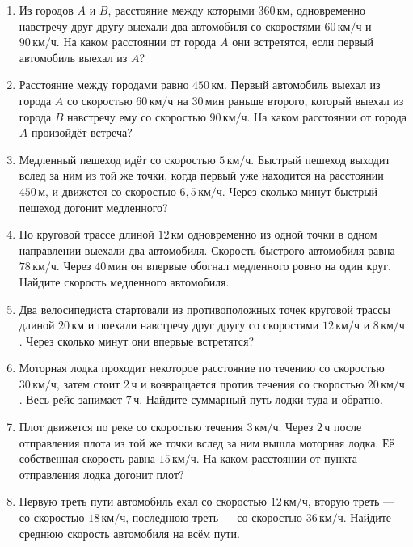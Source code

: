 \documentclass[a4paper,12pt]{article}
\newcommand{\unit}[1]{\,\text{#1}}
\begin{document}
\begin{enumerate}

\item
Из городов $A$ и $B$, расстояние между которыми $360\unit{км}$,
одновременно навстречу друг другу выехали два автомобиля
со скоростями $60\unit{км/ч}$ и $90\unit{км/ч}$.
На каком расстоянии от города $A$ они встретятся,
если первый автомобиль выехал из $A$?

\item
Расстояние между городами равно $450\unit{км}$.
Первый автомобиль выехал из города $A$ со скоростью $60\unit{км/ч}$
на $30\unit{мин}$ раньше второго,
который выехал из города $B$ навстречу ему со скоростью $90\unit{км/ч}$.
На каком расстоянии от города $A$ произойдёт встреча?

\item
Медленный пешеход идёт со скоростью $5\unit{км/ч}$.
Быстрый пешеход выходит вслед за ним из той же точки,
когда первый уже находится на расстоянии $450\unit{м}$,
и движется со скоростью $6{,}5\unit{км/ч}$.
Через сколько минут быстрый пешеход догонит медленного?

\item
По круговой трассе длиной $12\unit{км}$ одновременно
из одной точки в одном направлении выехали два автомобиля.
Скорость быстрого автомобиля равна $78\unit{км/ч}$.
Через $40\unit{мин}$ он впервые обогнал медленного ровно на один круг.
Найдите скорость медленного автомобиля.

\item
Два велосипедиста стартовали из противоположных точек
круговой трассы длиной $20\unit{км}$
и поехали навстречу друг другу со скоростями
$12\unit{км/ч}$ и $8\unit{км/ч}$.
Через сколько минут они впервые встретятся?

\item
Моторная лодка проходит некоторое расстояние по течению
со скоростью $30\unit{км/ч}$, затем стоит $2\unit{ч}$
и возвращается против течения со скоростью $20\unit{км/ч}$.
Весь рейс занимает $7\unit{ч}$.
Найдите суммарный путь лодки туда и обратно.

\item
Плот движется по реке со скоростью течения $3\unit{км/ч}$.
Через $2\unit{ч}$ после отправления плота из той же точки
вслед за ним вышла моторная лодка.
Её собственная скорость равна $15\unit{км/ч}$.
На каком расстоянии от пункта отправления лодка догонит плот?

\item
Первую треть пути автомобиль ехал со скоростью $12\unit{км/ч}$,
вторую треть --- со скоростью $18\unit{км/ч}$,
последнюю треть --- со скоростью $36\unit{км/ч}$.
Найдите среднюю скорость автомобиля на всём пути.


\end{enumerate}
\end{document}
